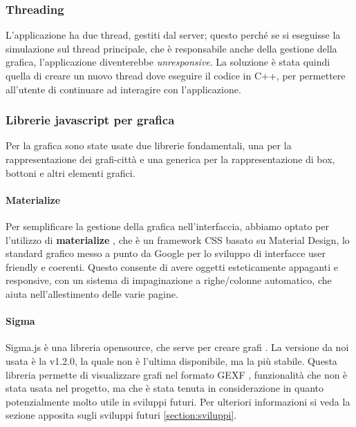\documentclass[main.tex]{subfiles}
\begin{document}
\subsubsection{Threading}
L'applicazione ha due thread, gestiti dal server; questo perché se si eseguisse la simulazione sul thread principale, che è responsabile anche della gestione della grafica, l'applicazione diventerebbe \textit{unresponsive}. La soluzione è stata quindi quella di creare un nuovo thread dove eseguire il codice in C++, per permettere all'utente di continuare ad interagire con l'applicazione. 

\subsubsection{Librerie javascript per grafica}
Per la grafica sono state usate due librerie fondamentali, una per la rappresentazione dei grafi-città e una generica per la rappresentazione di box, bottoni e altri elementi grafici. 

\paragraph{Materialize}

Per semplificare la gestione della grafica nell'interfaccia, abbiamo optato per l'utilizzo di \textbf{materialize} \cite{materialize}, che è un framework CSS basato su Material Design, lo standard grafico messo a punto da Google per lo sviluppo di interfacce user friendly e coerenti. Questo consente di avere oggetti esteticamente appaganti e responsive, con un sistema di impaginazione a righe/colonne automatico, che aiuta nell'allestimento delle varie pagine.

\paragraph{Sigma} 

Sigma.js è una libreria opensource, che serve per creare grafi \cite{sigmajs}. La versione da noi usata è la v1.2.0, la quale non è l'ultima disponibile, ma la più stabile. Questa libreria permette di visualizzare grafi nel formato GEXF \cite{gexf}, funzionalità che non è stata usata nel progetto, ma che è stata tenuta in considerazione in quanto potenzialmente molto utile in sviluppi futuri. Per ulteriori informazioni si veda la sezione apposita sugli sviluppi futuri  
\ref{section:sviluppi}.
\end{document}
